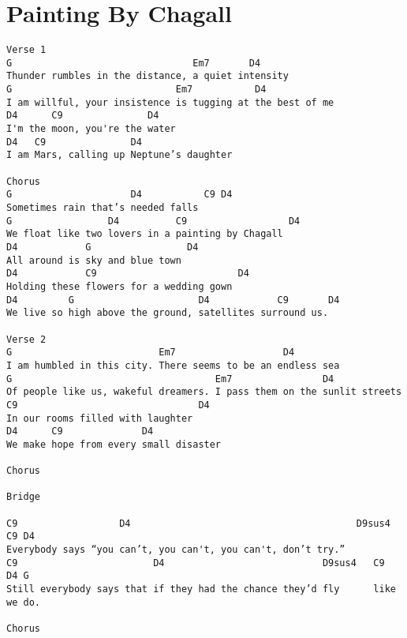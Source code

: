 \documentclass[leqno]{memoir}
\begin{document}
\chapter{Painting By Chagall}
\begin{verbatim}
Verse 1
G                                Em7       D4
Thunder rumbles in the distance, a quiet intensity
G                             Em7           D4
I am willful, your insistence is tugging at the best of me
D4      C9               D4
I'm the moon, you're the water
D4   C9               D4
I am Mars, calling up Neptune’s daughter

Chorus
G                     D4           C9 D4
Sometimes rain that’s needed falls
G                 D4          C9                  D4
We float like two lovers in a painting by Chagall
D4            G                 D4
All around is sky and blue town
D4            C9                         D4
Holding these flowers for a wedding gown
D4         G                      D4            C9       D4
We live so high above the ground, satellites surround us.

Verse 2
G                          Em7                   D4
I am humbled in this city. There seems to be an endless sea
G                                    Em7                D4
Of people like us, wakeful dreamers. I pass them on the sunlit streets
C9                                D4
In our rooms filled with laughter
D4      C9              D4
We make hope from every small disaster

Chorus

Bridge

C9                  D4                                        D9sus4  C9 D4
Everybody says “you can’t, you can't, you can't, don’t try.”
C9                        D4                            D9sus4   C9   D4 G
Still everybody says that if they had the chance they’d fly      like we do.

Chorus
\end{verbatim}
\newpage
\end{document}
